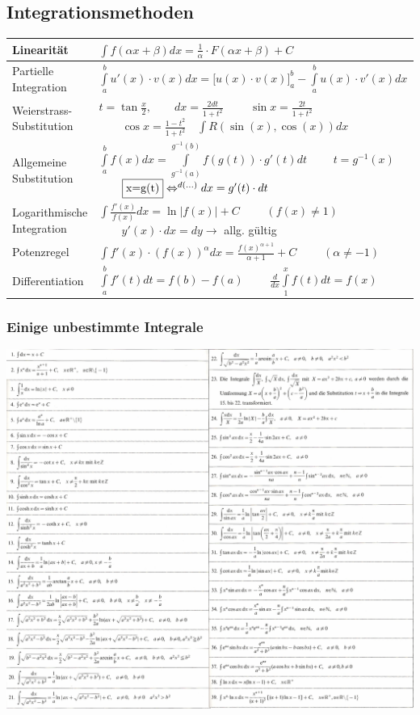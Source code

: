 \subsection{Integrationsmethoden }
\renewcommand{\arraystretch}{2}
\begin{tabular}{| l | l |}
	\hline
		Linearität &
			$\int{f(\alpha x+\beta )dx=\frac{1}{\alpha}\cdot F(\alpha x+\beta)+C}$ \\
	\hline
		Partielle Integration &
			$\int\limits_a^b{u'(x)\cdot v(x)dx}=\biggl[ u(x)\cdot v(x) \biggr]_a^b-\int\limits_a^b{u(x)\cdot v'(x)dx}$ \\
	\hline
		Weierstrass-Substitution\formelbuch{494} &
			$t=\tan\frac{x}{2}, \qquad dx=\frac{2dt}{1+t^2}$
			$\qquad \sin  x=\frac{2t}{1+t^2}$
			$\qquad \cos x=\frac{1-t^2}{1+t^2} \quad\int{R(\sin(x),\cos(x))dx}$ \\
	\hline
		Allgemeine Substitution &
			$\int\limits_{a}^{b}{f(x)dx}=\int\limits_{g^{-1}(a)}^{g^{-1}(b)}{f(g(t))\cdot g'(t)dt}$
			$\qquad t=g^{-1}(x)$
			$\qquad  \fbox{x=g(t)}\Leftrightarrow^{d(...)} dx=g'(t)\cdot dt$ \\
	\hline
		Logarithmische Integration &
			$\int{\frac{f'(x)}{f(x)}dx}=\ln|f(x)|+C$
			$\qquad {(f(x)\neq 1)}$
			$\qquad y'(x)\cdot dx = dy \rightarrow$ allg. gültig\\
	\hline
		Potenzregel &
			$\int{f'(x)\cdot (f(x))^{\alpha} dx}=\frac{f(x)^{\alpha +1}}{\alpha+1}+C$
			$\qquad{(\alpha \neq -1)}$ \\
	\hline
		Differentiation &
			$\int \limits ^{b} _{a} {f'(t)dt}=f(b)-f(a)$
			$\qquad \frac{d}{dx} \int \limits ^{x} _{1} {f(t)dt}=f(x)$ \\
	\hline
\end{tabular}
\renewcommand{\arraystretch}{1}


\subsubsection{Einige unbestimmte Integrale }
\includegraphics[width=17.7cm]{./bilder/integrale.png} 




